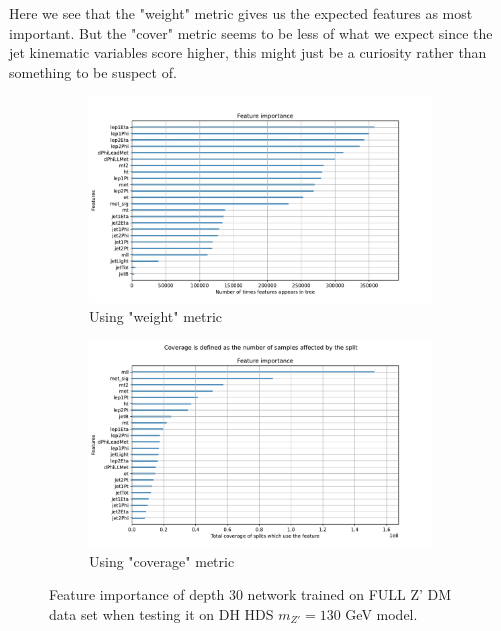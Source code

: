 \documentclass[14pt, a4paper]{book}
\begin{document}
Here we see that the "weight" metric gives us the expected features as most important. But the "cover" metric seems to be less of what we expect since the jet kinematic variables score higher, 
this might just be a curiosity rather than something to be suspect of.
\graphicspath{{../../../Plots/XGBoost/FULL/GRIDSEARCH_n_est_10-1000/DH_HDS_mZp_130/feature_importance/}}
\begin{figure}[!ht]
	\centering
   \begin{subfigure}[b]{0.8\textwidth}
      \centering
      \includegraphics[width=1\textwidth]{weight.pdf}
      \caption{Using "weight" metric}
   \end{subfigure}
   \hfill
   \begin{subfigure}[b]{0.8\textwidth}
      \centering
      \includegraphics[width=1\textwidth]{total_cover.pdf}
      \caption{Using "coverage" metric}
   \end{subfigure}
   \caption{Feature importance of depth 30 network trained on FULL Z' DM data set when testing it on DH HDS $m_{Z'}=130$ GeV model.}\label{fig:BDT_feat}
\end{figure}
\end{document}

